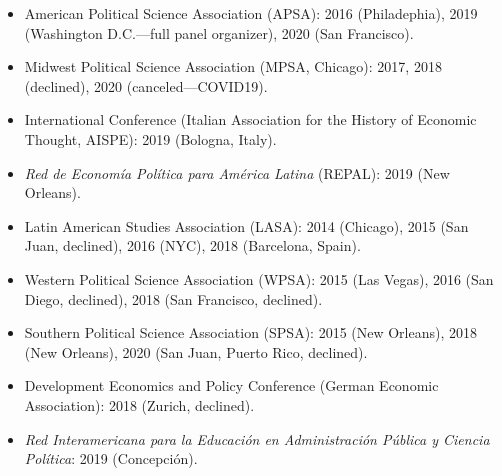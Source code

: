\begin{itemize}
\item American Political Science Association (APSA): 2016 (Philadephia), 2019 (Washington D.C.---full panel organizer), 2020 (San Francisco).
\item Midwest Political Science Association (MPSA, Chicago): 2017, 2018 (declined), 2020 (canceled---COVID19).
\item International Conference (Italian Association for the History of Economic Thought, AISPE): 2019 (Bologna, Italy).
\item \emph{Red de Econom\'ia Pol\'itica para Am\'erica Latina} (REPAL): 2019 (New Orleans).
\item Latin American Studies Association (LASA): 2014 (Chicago), 2015 (San Juan, declined), 2016 (NYC), 2018 (Barcelona, Spain).
\item Western Political Science Association (WPSA): 2015 (Las Vegas), 2016 (San Diego, declined), 2018 (San Francisco, declined).
\item Southern Political Science Association (SPSA): 2015 (New Orleans), 2018 (New Orleans), 2020 (San Juan, Puerto Rico, declined).
\item Development Economics and Policy Conference (German Economic Association): 2018 (Zurich, declined).
\item \emph{Red Interamericana para la Educaci\'on en Administraci\'on P\'ublica y Ciencia Pol\'itica}: 2019 (Concepci\'on).
\end{itemize}

